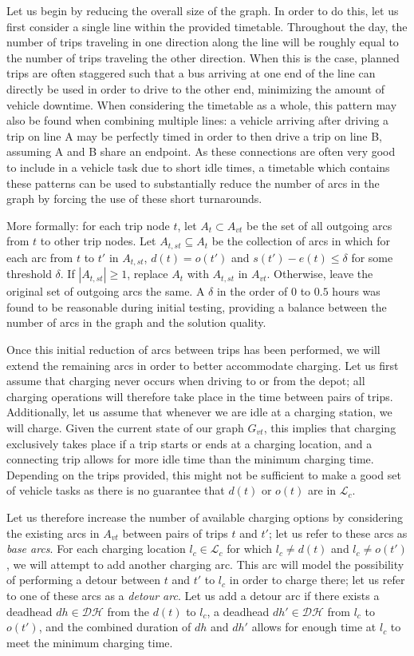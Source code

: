 \documentclass[]{article}
\begin{document}
Let us begin by reducing the overall size of the graph. In order to do this, let us first consider a single line within the provided timetable. Throughout the day, the number of trips traveling in one direction along the line will be roughly equal to the number of trips traveling the other direction. When this is the case, planned trips are often staggered such that a bus arriving at one end of the line can directly be used in order to drive to the other end, minimizing the amount of vehicle downtime. When considering the timetable as a whole, this pattern may also be found when combining multiple lines: a vehicle arriving after driving a trip on line A may be perfectly timed in order to then drive a trip on line B, assuming A and B share an endpoint. As these connections are often very good to include in a vehicle task due to short idle times, a timetable which contains these patterns can be used to substantially reduce the number of arcs in the graph by forcing the use of these short turnarounds. 

More formally: for each trip node $t$, let $A_t \subset A_{vt}$ be the set of all outgoing arcs from $t$ to other trip nodes. Let $A_{t,st} \subseteq A_t$ be the collection of arcs in which for each arc from $t$ to $t'$ in $A_{t,st}$, $d(t) = o(t')$ and $s(t') - e(t) \leq \delta$ for some threshold $\delta$. If $|A_{t,st}| \geq 1$, replace $A_t$ with $A_{t,st}$ in $A_{vt}$. Otherwise, leave the original set of outgoing arcs the same. A $\delta$ in the order of $0$ to $0.5$ hours was found to be reasonable during initial testing, providing a balance between the number of arcs in the graph and the solution quality.

Once this initial reduction of arcs between trips has been performed, we will extend the remaining arcs in order to better accommodate charging. Let us first assume that charging never occurs when driving to or from the depot; all charging operations will therefore take place in the time between pairs of trips. Additionally, let us assume that whenever we are idle at a charging station, we will charge. Given the current state of our graph $G_{vt}$, this implies that charging exclusively takes place if a trip starts or ends at a charging location, and a connecting trip allows for more idle time than the minimum charging time. Depending on the trips provided, this might not be sufficient to make a good set of vehicle tasks as there is no guarantee that $d(t)$ or $o(t)$ are in $\mathcal{L}_c$.

Let us therefore increase the number of available charging options by considering the existing arcs in $A_{vt}$ between pairs of trips $t$ and $t'$; let us refer to these arcs as \emph{base arcs}. For each charging location $l_c \in \mathcal{L}_c$ for which $l_c \neq d(t)$ and $l_c \neq o(t')$, we will attempt to add another charging arc. This arc will model the possibility of performing a detour between $t$ and $t'$ to $l_c$ in order to charge there; let us refer to one of these arcs as a \emph{detour arc}. Let us add a detour arc if there exists a deadhead $dh \in \mathcal{DH}$ from the $d(t)$ to $l_c$, a deadhead $dh' \in \mathcal{DH}$ from $l_c$ to $o(t')$, and the combined duration of $dh$ and $dh'$ allows for enough time at $l_c$ to meet the minimum charging time. 
\end{document}
